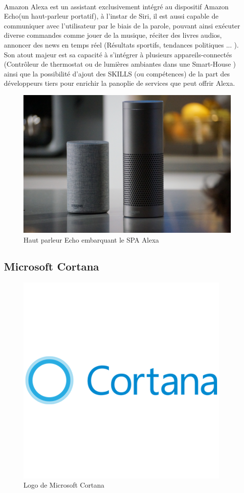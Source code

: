\paragraph{}Amazon Alexa est un assistant exclusivement intégré au dispositif Amazon Echo(un haut-parleur portatif), à l'instar de Siri, il est aussi capable de communiquer avec l'utilisateur par le biais de la parole, pouvant ainsi exécuter diverse commandes comme jouer de la musique, réciter des livres audios, annoncer des news en temps réel (Résultats sportifs, tendances politiques ... ). Son atout majeur est sa capacité à s'intégrer à plusieurs appareils-connectés (Contrôleur de thermostat ou de lumières ambiantes dans une Smart-House ) ainsi que la possibilité d'ajout des SKILLS (ou compétences) de la part des développeurs tiers pour enrichir la panoplie de services que peut offrir Alexa.
\begin{figure}[H]
	\centering
	\includegraphics[width=.75\linewidth]{images/amazon_alexa/alexa.png}
	\caption{Haut parleur Echo embarquant le SPA Alexa} 
\end{figure}
\subsection*{Microsoft Cortana}
\begin{figure}[H]
	\centering
	\includegraphics[width=.5\linewidth]{images/cortana/logo.png}
	\caption{Logo de Microsoft Cortana} 
\end{figure}
